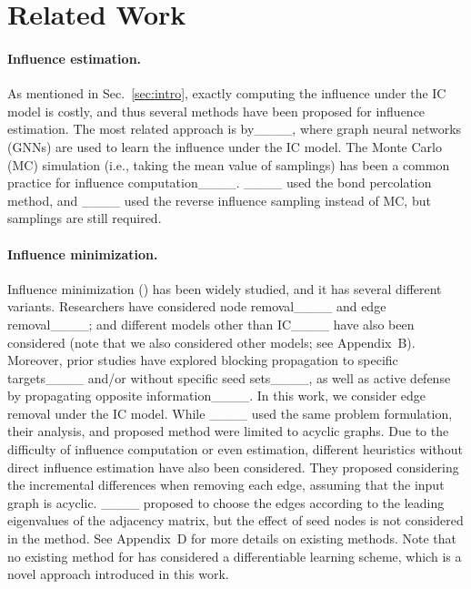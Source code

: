 \section{Related Work}
\label{sec:related}
\paragraph{Influence estimation.}
As mentioned in Sec.~\ref{sec:intro},
exactly computing the influence under the IC model is costly, and thus
several methods have been proposed for influence estimation.
The most related approach is by____, where graph neural networks (GNNs) are used to learn the influence under the IC model.
The Monte Carlo (MC) simulation (i.e., taking the mean value of samplings) has been a common practice for influence computation____.
____ used the bond percolation method, and ____ used the reverse influence sampling instead of MC, but samplings are still required.

\paragraph{Influence minimization.}
Influence minimization (\influenceMinimization) has been widely studied, and it has several different variants.
Researchers have considered node removal____
and edge removal____;
and different models other than IC____ have also been considered (note that we also considered other models; see Appendix~B).
Moreover, prior studies have explored blocking propagation to specific targets____ and/or without specific seed sets____, as well as
active defense by propagating opposite information____.
In this work, we consider edge removal under the IC model. While
____ used the same problem formulation, their analysis, and proposed method were limited to acyclic graphs.
Due to the difficulty of influence computation or even estimation, different heuristics without direct influence estimation have also been considered.
They proposed considering the incremental differences when removing each edge, assuming that the input graph is acyclic.
____ proposed to choose the edges according to the leading eigenvalues of the adjacency matrix, but the effect of seed nodes is not considered in the method.
See Appendix~D 
for more details on existing \influenceMinimization methods.
Note that no existing method for \influenceMinimization has considered a differentiable learning scheme, which is a novel approach introduced in this work.